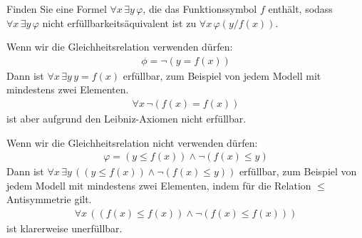
\begin{exercise}[176]
Finden Sie eine Formel $\forall x\, \exists y\, \varphi$, die das Funktionssymbol $f$
enthält, sodass $\forall x\, \exists y\, \varphi$ nicht erfüllbarkeitsäquivalent ist zu
$\forall x\, \varphi(y/f(x))$.
\end{exercise}



\begin{solution}
	Wenn wir die Gleichheitsrelation verwenden dürfen:
	\begin{align*}
		\phi = \neg(y = f(x))
	\end{align*}
	Dann ist $\forall x\, \exists y\, y = f(x)$ erfüllbar, zum Beispiel von jedem
	Modell mit mindestens zwei Elementen.
	\begin{align*}
		\forall x\, \neg(f(x) = f(x))
	\end{align*}
	ist aber aufgrund den Leibniz-Axiomen nicht erfüllbar.
\end{solution}



\begin{solution}
	Wenn wir die Gleichheitsrelation nicht verwenden dürfen:
	\begin{align*}
		\varphi = (y \leq f(x)) \land \neg(f(x) \leq y)
	\end{align*}
	Dann ist $\forall x\, \exists y\, ((y \leq f(x)) \land \neg(f(x) \leq y))$ erfüllbar,
	zum Beispiel von jedem Modell mit mindestens zwei Elementen, indem für die
	Relation $\leq$ Antisymmetrie gilt.
	\begin{align*}
		\forall x\, ((f(x) \leq f(x)) \land \neg(f(x) \leq f(x)))
	\end{align*}
	ist klarerweise unerfüllbar.
\end{solution}



